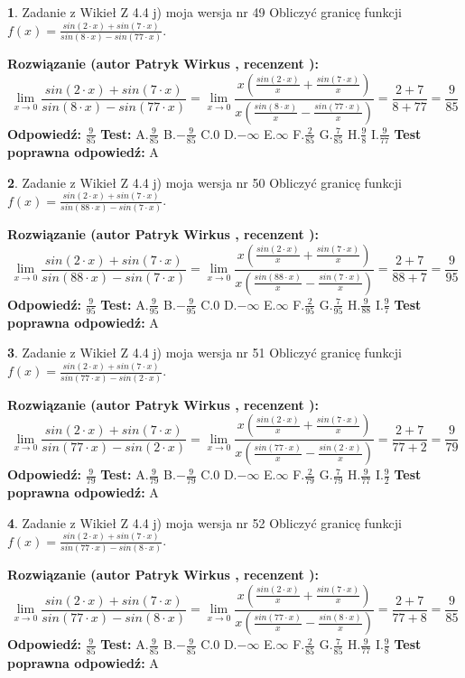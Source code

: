 \documentclass[12pt, a4paper]{article}
\theoremstyle{definition} %
\newtheorem{zad}{}
\newcommand{\zadStart}[1]{\begin{zad}#1\newline}
\newcommand{\zadStop}{\end{zad}}
\newcommand{\rozwStart}[2]{\noindent \textbf{Rozwiązanie (autor #1 , recenzent #2): }\newline}
\newcommand{\rozwStop}{\newline}
\newcommand{\odpStart}{\noindent \textbf{Odpowiedź:}\newline}
\newcommand{\odpStop}{\newline}
\newcommand{\testStart}{\noindent \textbf{Test:}\newline}
\newcommand{\testStop}{\newline}
\newcommand{\kluczStart}{\noindent \textbf{Test poprawna odpowiedź:}\newline}
\newcommand{\kluczStop}{\newline}
\begin{document}
\zadStart{Zadanie z Wikieł Z 4.4 j) moja wersja nr 49}
Obliczyć granicę funkcji $f(x)=\frac{sin(2\cdot x) +sin(7\cdot x)}{sin(8\cdot x) -sin(77\cdot x)}$.
\zadStop
\rozwStart{Patryk Wirkus}{}
$$\lim\limits_{x\to 0}\frac{sin(2\cdot x) +sin(7\cdot x)}{sin(8\cdot x) -sin(77\cdot x)}=\lim\limits_{x\to 0}\frac{x(\frac{sin(2\cdot x)}{x}+\frac{sin(7\cdot x)}{x})}{x(\frac{sin(8\cdot x)}{x}-\frac{sin(77\cdot x)}{x})}=\frac{2+7}{8+77} = \frac{9}{85}$$
\rozwStop
\odpStart
$\frac{9}{85}$
\odpStop
\testStart
A.$\frac{9}{85}$
B.$-\frac{9}{85}$
C.$0$
D.$-\infty$
E.$\infty$
F.$\frac{2}{85}$
G.$\frac{7}{85}$
H.$\frac{9}{8}$
I.$\frac{9}{77}$
\testStop
\kluczStart
A
\kluczStop



\zadStart{Zadanie z Wikieł Z 4.4 j) moja wersja nr 50}
Obliczyć granicę funkcji $f(x)=\frac{sin(2\cdot x) +sin(7\cdot x)}{sin(88\cdot x) -sin(7\cdot x)}$.
\zadStop
\rozwStart{Patryk Wirkus}{}
$$\lim\limits_{x\to 0}\frac{sin(2\cdot x) +sin(7\cdot x)}{sin(88\cdot x) -sin(7\cdot x)}=\lim\limits_{x\to 0}\frac{x(\frac{sin(2\cdot x)}{x}+\frac{sin(7\cdot x)}{x})}{x(\frac{sin(88\cdot x)}{x}-\frac{sin(7\cdot x)}{x})}=\frac{2+7}{88+7} = \frac{9}{95}$$
\rozwStop
\odpStart
$\frac{9}{95}$
\odpStop
\testStart
A.$\frac{9}{95}$
B.$-\frac{9}{95}$
C.$0$
D.$-\infty$
E.$\infty$
F.$\frac{2}{95}$
G.$\frac{7}{95}$
H.$\frac{9}{88}$
I.$\frac{9}{7}$
\testStop
\kluczStart
A
\kluczStop



\zadStart{Zadanie z Wikieł Z 4.4 j) moja wersja nr 51}
Obliczyć granicę funkcji $f(x)=\frac{sin(2\cdot x) +sin(7\cdot x)}{sin(77\cdot x) -sin(2\cdot x)}$.
\zadStop
\rozwStart{Patryk Wirkus}{}
$$\lim\limits_{x\to 0}\frac{sin(2\cdot x) +sin(7\cdot x)}{sin(77\cdot x) -sin(2\cdot x)}=\lim\limits_{x\to 0}\frac{x(\frac{sin(2\cdot x)}{x}+\frac{sin(7\cdot x)}{x})}{x(\frac{sin(77\cdot x)}{x}-\frac{sin(2\cdot x)}{x})}=\frac{2+7}{77+2} = \frac{9}{79}$$
\rozwStop
\odpStart
$\frac{9}{79}$
\odpStop
\testStart
A.$\frac{9}{79}$
B.$-\frac{9}{79}$
C.$0$
D.$-\infty$
E.$\infty$
F.$\frac{2}{79}$
G.$\frac{7}{79}$
H.$\frac{9}{77}$
I.$\frac{9}{2}$
\testStop
\kluczStart
A
\kluczStop



\zadStart{Zadanie z Wikieł Z 4.4 j) moja wersja nr 52}
Obliczyć granicę funkcji $f(x)=\frac{sin(2\cdot x) +sin(7\cdot x)}{sin(77\cdot x) -sin(8\cdot x)}$.
\zadStop
\rozwStart{Patryk Wirkus}{}
$$\lim\limits_{x\to 0}\frac{sin(2\cdot x) +sin(7\cdot x)}{sin(77\cdot x) -sin(8\cdot x)}=\lim\limits_{x\to 0}\frac{x(\frac{sin(2\cdot x)}{x}+\frac{sin(7\cdot x)}{x})}{x(\frac{sin(77\cdot x)}{x}-\frac{sin(8\cdot x)}{x})}=\frac{2+7}{77+8} = \frac{9}{85}$$
\rozwStop
\odpStart
$\frac{9}{85}$
\odpStop
\testStart
A.$\frac{9}{85}$
B.$-\frac{9}{85}$
C.$0$
D.$-\infty$
E.$\infty$
F.$\frac{2}{85}$
G.$\frac{7}{85}$
H.$\frac{9}{77}$
I.$\frac{9}{8}$
\testStop
\kluczStart
A
\kluczStop
\end{document}
